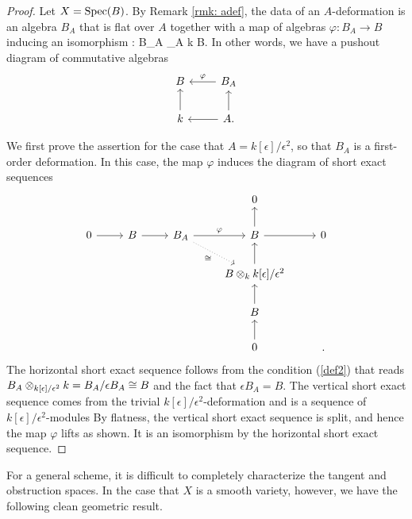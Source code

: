 \documentclass[11pt]{amsart}
\def\Spec{{\rm Spec}}
\begin{document}
\begin{proof}
Let $X = \Spec(B)$.
By Remark \ref{rmk: adef}, the data of an $A$-deformation is an algebra $B_A$ that is flat over $A$ together with a map of algebras $\varphi : B_A \to B$ inducing an isomorphism 
\beqn\label{def2}
\varphi : B_A \tensor_A k \xto{\cong} B.
\eeqn
In other words, we have a pushout diagram of commutative algebras
\[
\begin{tikzcd}
B & B_A \ar[l,"\varphi"']\\ 
k \ar[u] & A \ar[u] \ar[l] .
\end{tikzcd} 
\]

We first prove the assertion for the case that $A = k[\epsilon]/\epsilon^2$, so that $B_A$ is a first-order deformation. 
In this case, the map $\varphi$ induces the diagram of short exact sequences
\[
\begin{tikzcd}
& & & 0 & \\
0 \ar[r] & B \ar[r] & B_A \ar[dr, dotted, "\cong"'] \ar[r,"\varphi"] & B \ar[u] \ar[r] & 0 \\
& & & B \tensor_k k[\epsilon]/\epsilon^2 \ar[u] &  \\
& & & B \ar[u] & \\
& & & 0 \ar[u] & .
\end{tikzcd}
\]
The horizontal short exact sequence follows from the condition (\ref{def2}) that reads $B_A \otimes_{k[\epsilon]/\epsilon^2} k = B_A / \epsilon B_A \cong B$ and the fact that $\epsilon B_A = B$. 
The vertical short exact sequence comes from the trivial $k[\epsilon]/\epsilon^2$-deformation and is a sequence of $k[\epsilon]/\epsilon^2$-modules
By flatness, the vertical short exact sequence is split, and hence the map $\varphi$ lifts as shown. 
It is an isomorphism by the horizontal short exact sequence. 


\end{proof} 

For a general scheme, it is difficult to completely characterize the tangent and obstruction spaces. 
In the case that $X$ is a smooth variety, however, we have the following clean geometric result.
\end{document}
